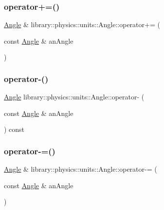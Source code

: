 \mbox{\label{classlibrary_1_1physics_1_1units_1_1_angle_a5f20b012cb332e631a6271144a0817a2}} 
\subsubsection{\texorpdfstring{operator+=()}{operator+=()}}
{\footnotesize\ttfamily \hyperlink{classlibrary_1_1physics_1_1units_1_1_angle}{Angle} \& library\+::physics\+::units\+::\+Angle\+::operator+= (\begin{DoxyParamCaption}\item[{const \hyperlink{classlibrary_1_1physics_1_1units_1_1_angle}{Angle} \&}]{an\+Angle }\end{DoxyParamCaption})}

\mbox{\label{classlibrary_1_1physics_1_1units_1_1_angle_a034a88587139bb8642e80f353ead5ce2}} 
\subsubsection{\texorpdfstring{operator-\/()}{operator-()}}
{\footnotesize\ttfamily \hyperlink{classlibrary_1_1physics_1_1units_1_1_angle}{Angle} library\+::physics\+::units\+::\+Angle\+::operator-\/ (\begin{DoxyParamCaption}\item[{const \hyperlink{classlibrary_1_1physics_1_1units_1_1_angle}{Angle} \&}]{an\+Angle }\end{DoxyParamCaption}) const}

\mbox{\label{classlibrary_1_1physics_1_1units_1_1_angle_a2278161c893f91578913951c62f29c39}} 
\subsubsection{\texorpdfstring{operator-\/=()}{operator-=()}}
{\footnotesize\ttfamily \hyperlink{classlibrary_1_1physics_1_1units_1_1_angle}{Angle} \& library\+::physics\+::units\+::\+Angle\+::operator-\/= (\begin{DoxyParamCaption}\item[{const \hyperlink{classlibrary_1_1physics_1_1units_1_1_angle}{Angle} \&}]{an\+Angle }\end{DoxyParamCaption})}


